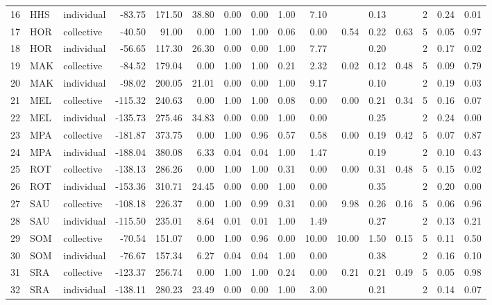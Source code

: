 {\begin{tabular}{rllrrrrrrrrrrrrr}
  16 & HHS & individual & -83.75 & 171.50 & 38.80 & 0.00 & 0.00 & 1.00 & 7.10 &  & 0.13 &  &   2 & 0.24 & 0.01 \\ 
  17 & HOR & collective & -40.50 & 91.00 & 0.00 & 1.00 & 1.00 & 0.06 & 0.00 & 0.54 & 0.22 & 0.63 &   5 & 0.05 & 0.97 \\ 
  18 & HOR & individual & -56.65 & 117.30 & 26.30 & 0.00 & 0.00 & 1.00 & 7.77 &  & 0.20 &  &   2 & 0.17 & 0.02 \\ 
  19 & MAK & collective & -84.52 & 179.04 & 0.00 & 1.00 & 1.00 & 0.21 & 2.32 & 0.02 & 0.12 & 0.48 &   5 & 0.09 & 0.79 \\ 
  20 & MAK & individual & -98.02 & 200.05 & 21.01 & 0.00 & 0.00 & 1.00 & 9.17 &  & 0.10 &  &   2 & 0.19 & 0.03 \\ 
  21 & MEL & collective & -115.32 & 240.63 & 0.00 & 1.00 & 1.00 & 0.08 & 0.00 & 0.00 & 0.21 & 0.34 &   5 & 0.16 & 0.07 \\ 
  22 & MEL & individual & -135.73 & 275.46 & 34.83 & 0.00 & 0.00 & 1.00 & 0.00 &  & 0.25 &  &   2 & 0.24 & 0.00 \\ 
  23 & MPA & collective & -181.87 & 373.75 & 0.00 & 1.00 & 0.96 & 0.57 & 0.58 & 0.00 & 0.19 & 0.42 &   5 & 0.07 & 0.87 \\ 
  24 & MPA & individual & -188.04 & 380.08 & 6.33 & 0.04 & 0.04 & 1.00 & 1.47 &  & 0.19 &  &   2 & 0.10 & 0.43 \\ 
  25 & ROT & collective & -138.13 & 286.26 & 0.00 & 1.00 & 1.00 & 0.31 & 0.00 & 0.00 & 0.31 & 0.48 &   5 & 0.15 & 0.02 \\ 
  26 & ROT & individual & -153.36 & 310.71 & 24.45 & 0.00 & 0.00 & 1.00 & 0.00 &  & 0.35 &  &   2 & 0.20 & 0.00 \\ 
  27 & SAU & collective & -108.18 & 226.37 & 0.00 & 1.00 & 0.99 & 0.31 & 0.00 & 9.98 & 0.26 & 0.16 &   5 & 0.06 & 0.96 \\ 
  28 & SAU & individual & -115.50 & 235.01 & 8.64 & 0.01 & 0.01 & 1.00 & 1.49 &  & 0.27 &  &   2 & 0.13 & 0.21 \\ 
  29 & SOM & collective & -70.54 & 151.07 & 0.00 & 1.00 & 0.96 & 0.00 & 10.00 & 10.00 & 1.50 & 0.15 &   5 & 0.11 & 0.50 \\ 
  30 & SOM & individual & -76.67 & 157.34 & 6.27 & 0.04 & 0.04 & 1.00 & 0.00 &  & 0.38 &  &   2 & 0.16 & 0.10 \\ 
  31 & SRA & collective & -123.37 & 256.74 & 0.00 & 1.00 & 1.00 & 0.24 & 0.00 & 0.21 & 0.21 & 0.49 &   5 & 0.05 & 0.98 \\ 
  32 & SRA & individual & -138.11 & 280.23 & 23.49 & 0.00 & 0.00 & 1.00 & 3.00 &  & 0.21 &  &   2 & 0.14 & 0.07 \\ 

\end{tabular}}
